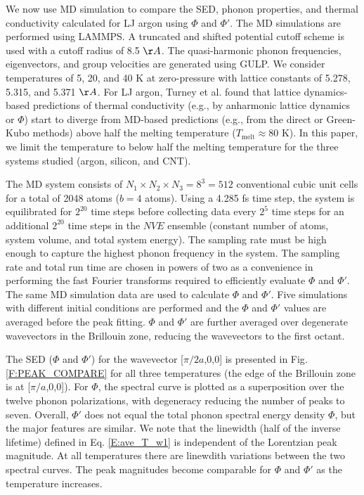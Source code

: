 \documentclass[aps,prb,preprint,superscriptaddress,amsmath,amssymb,floatfix]{revtex4}
\begin{document}
We now use MD simulation to compare the SED, phonon properties, and thermal conductivity calculated for LJ argon using $\Phi$ and $\Phi'$. The MD simulations are performed using LAMMPS.\cite{LAMMPS} A truncated and shifted
potential cutoff scheme is used with a cutoff radius of 8.5 $\AA$. The quasi-harmonic phonon frequencies, eigenvectors, and group velocities are generated using GULP.\cite{GULP} We consider temperatures of 5, 20, and 40 K at zero-pressure with lattice constants of 5.278, 5.315, and 5.371 $\AA$. For LJ argon, Turney et al. found that lattice dynamics-based predictions of thermal conductivity (e.g., by anharmonic lattice dynamics or $\Phi$) start to diverge from MD-based predictions (e.g., from the direct or Green-Kubo methods) above half the melting temperature ($T_{\mathrm{melt}} \approx 80$ K).\cite{turney2009a} In this paper, we limit the temperature to below half the melting temperature for the three systems studied (argon, silicon, and CNT).

The MD system consists of $N_1 \times N_2 \times N_3 = 8^3 = 512$ conventional cubic unit cells for a total of 2048 atoms ($b=4$ atoms). Using a 4.285 fs time step, the system is equilibrated for $2^{20}$ time steps before collecting data every $2^5$ time steps for an additional $2^{20}$ time steps in the $NVE$ ensemble (constant number of atoms, system volume, and total system energy).\cite{mcquarrie2000} The sampling rate must be high enough to capture the highest phonon frequency in the system. The sampling rate and total run time are chosen in powers of two as a convenience in performing the fast Fourier transforms required to efficiently evaluate $\Phi$ and $\Phi'$. The same MD simulation data are used to calculate $\Phi$ and $\Phi'$.  Five simulations with different initial conditions are performed and the $\Phi$ and $\Phi'$ values are averaged before the peak fitting. $\Phi$ and $\Phi'$ are further averaged over degenerate wavevectors in the Brillouin zone, reducing the wavevectors to the first octant.\cite{mcgaugheythesis}

The SED ($\Phi$ and $\Phi'$) for the wavevector [$\pi/2a$,0,0] is presented in Fig$.$ \ref{F:PEAK_COMPARE} for all three temperatures (the edge of the Brillouin zone is at [$\pi/a$,0,0]).  For $\Phi$, the spectral curve is plotted as a superposition over the twelve phonon polarizations, with degeneracy reducing the number of peaks to seven.  Overall, $\Phi'$ does not equal the total phonon spectral energy density $\Phi$, but the major features are similar. We note that the linewidth (half of the inverse lifetime) defined in Eq$.$ \eqref{E:ave_T_w1} is independent of the Lorentzian peak magnitude. At all temperatures there are linewdith variations between the two spectral curves. The peak magnitudes become comparable for $\Phi$ and $\Phi'$ as the temperature increases.
\end{document}
